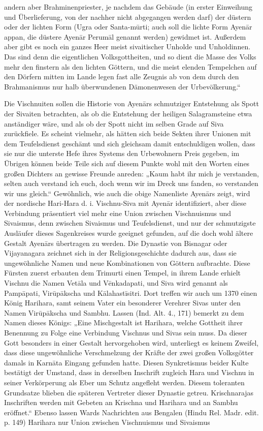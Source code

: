 \documentclass{article}
\begin{document}
andern aber Brahminenpriester, je nachdem das Gebäude (in erster Einweihung und Überlieferung, von der nachher nicht abgegangen werden darf) der düstern oder der lichten Form (Ugra oder Santa-m\={u}rti; auch soll die lichte Form Ayen\={a}r appan, die düstere Ayen\={a}r Perum\={a}l genannt werden) gewidmet ist. Außerdem aber gibt es noch ein ganzes Heer meist sivaitischer Unholde und Unholdinnen. Das sind denn die eigentlichen Volksgottheiten, und so dient die Masse des Volks mehr den finstern als den lichten Göttern, und die meist elenden Tempelchen auf den Dörfern mitten im Lande legen fast alle Zeugnis ab von dem durch den Brahmanismus nur halb überwundenen Dämonenwesen der Urbevölkerung.“

Die Vischnuiten sollen die Historie von Ayen\={a}rs schmutziger Entstehung als Spott der Sivaiten betrachten, als ob die Entstehung der heiligen Salagramsteine etwa anständiger wäre, und als ob der Spott nicht im selben Grade auf Siva zurückfiele. Es scheint vielmehr, als hätten sich beide Sekten ihrer Unionen mit dem Teufelsdienst geschämt und sich gleichsam damit entschuldigen wollen, dass sie nur die unterste Hefe ihres Systems den Urbewohnern Preis gegeben, im Übrigen können beide Teile sich auf diesem Punkte wohl mit den Worten eines großen Dichters an gewisse Freunde anreden: „Kaum habt ihr mich je verstanden, selten auch verstand ich euch, doch wenn wir im Dreck uns fanden, so verstanden wir uns gleich.“ Gewöhnlich, wie auch die obige Namenliste Ayen\={a}rs zeigt, wird der nordische Hari-Hara d. i. Vischnu-Siva mit Ayen\={a}r identifiziert, aber diese Verbindung präsentiert viel mehr eine Union zwischen Vischnuismus und Sivaismus, denn zwischen Sivaismus und Teufelsdienst, und nur der schmutzigste Ausläufer dieses Sagenkreises wurde geeignet gefunden, auf die doch wohl ältere Gestalt Ayen\={a}rs übertragen zu werden. Die Dynastie von Bisnagar oder Vijayanagara zeichnet sich in der Religionsgeschichte dadurch aus, dass sie ungewöhnliche Namen und neue Kombinationen von Göttern aufbrachte. Diese Fürsten zuerst erbauten dem Trimurti einen Tempel, in ihrem Lande erhielt Vischnu die Namen Vet\={a}la und V\={e}nkadapati, und Siva wird genannt als Pamp\={a}pati, Vir\={u}p\={a}kscha und K\={a}lahast\={i}sitri. Dort treffen wir auch um 1370 einen König Harihara, samt seinem Vater ein besonderer Verehrer Sivas unter den Namen Vir\={u}p\={a}kscha und Sambhu. Lassen (Ind. Alt. 4., 171) bemerkt zu dem Namen dieses Königs: „Eine Mischgestalt ist Harihara, welche Gottheit ihrer Benennung zu Folge eine Verbindung Vischnus und Sivas sein muss. Da dieser Gott besonders in einer Gestalt hervorgehoben wird, unterliegt es keinem Zweifel, dass diese ungewöhnliche Verschmelzung der Kräfte der zwei großen Volksgötter damals in Karn\={a}ta Eingang gefunden hatte. Diesen Synkretismus beider Kulte bestätigt der Umstand, dass in derselben Inschrift zugleich Hara und Vischnu in seiner Verkörperung als Eber um Schutz angefleht werden. Diesem toleranten Grundsatze blieben die späteren Vertreter dieser Dynastie getreu. Krischnarajas Inschriften werden mit Gebeten an Krischna und Harihara und an Sambhu eröffnet.“ Ebenso lassen Wards Nachrichten aus Bengalen (Hindu Rel. Madr. edit. p. 149) Harihara nur Union zwischen Vischnuismus und Sivaismus 
\end{document}
